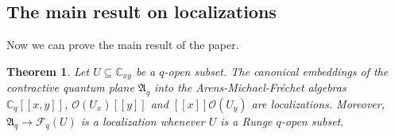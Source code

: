 \documentclass[12pt,reqno]{amsart}%
\newtheorem{theorem}{Theorem}
\theoremstyle{plain}
\numberwithin{theorem}{section} \numberwithin{equation}{section}
\numberwithin{lemma}{section}
\numberwithin{remark}{section}
\numberwithin{example}{section}
\numberwithin{proposition}{section}
\numberwithin{definition}{section}
\numberwithin{corollary}{section}
\begin{document}
\subsection{The main result on localizations}

Now we can prove the main result of the paper.

\begin{theorem}
\label{thCENTER}Let $U\subseteq\mathbb{C}_{xy}$ be a $q$-open subset. The
canonical embeddings of the contractive quantum plane $\mathfrak{A}_{q}$ into
the Arens-Michael-Fr\'{e}chet algebras $\mathbb{C}_{q}\left[  \left[
x,y\right]  \right]  $, $\mathcal{O}\left(  U_{x}\right)  \left[  \left[
y\right]  \right]  $ and $\left[  \left[  x\right]  \right]  \mathcal{O}%
\left(  U_{y}\right)  $ are localizations. Moreover, $\mathfrak{A}%
_{q}\rightarrow\mathcal{F}_{q}\left(  U\right)  $ is a localization whenever
$U$ is a Runge $q$-open subset.
\end{theorem}
\end{document}
